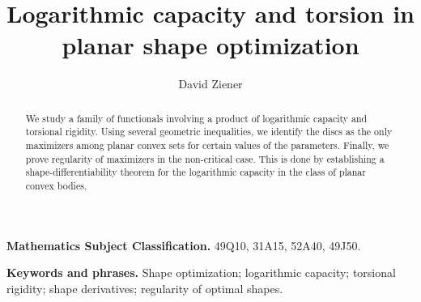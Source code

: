 \documentclass[11pt]{article}
\theoremstyle{plain}
\numberwithin{equation}{section}
\theoremstyle{definition}
\begin{document}
	\title{\textbf{Logarithmic capacity and torsion in planar shape optimization}}
	
	\author[1]{{\Large David Ziener}}
	
	
	\date{}
	
    \maketitle

	
	\begin{abstract}
	We study a family of functionals involving a product of logarithmic capacity and torsional rigidity. Using several geometric inequalities, we identify the discs as the only maximizers among planar convex sets for certain values of the parameters. Finally, we prove regularity of maximizers in the non-critical case. This is done by establishing a shape-differentiability theorem for the logarithmic capacity in the class of planar convex bodies.
	\end{abstract}

    \medskip

    \noindent\textbf{Mathematics Subject Classification.}
    49Q10, 31A15, 52A40, 49J50.

    \smallskip

    \noindent\textbf{Keywords and phrases.}
    Shape optimization; logarithmic capacity; torsional rigidity; shape derivatives; regularity of optimal shapes.
	
	
	\vspace{1cm}
\end{document}
